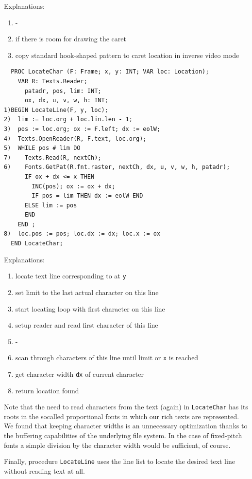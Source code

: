 Explanations:
\begin{enumerate}
  \item -
  \item if there is room for drawing the caret
  \item copy standard hook-shaped pattern to caret location in inverse video mode
\end{enumerate}

\begin{verbatim}
  PROC LocateChar (F: Frame; x, y: INT; VAR loc: Location);
    VAR R: Texts.Reader;
      patadr, pos, lim: INT;
      ox, dx, u, v, w, h: INT;
1)BEGIN LocateLine(F, y, loc);
2)  lim := loc.org + loc.lin.len - 1;
3)  pos := loc.org; ox := F.left; dx := eolW;
4)  Texts.OpenReader(R, F.text, loc.org);
5)  WHILE pos # lim DO
7)    Texts.Read(R, nextCh);
6)    Fonts.GetPat(R.fnt.raster, nextCh, dx, u, v, w, h, patadr);
      IF ox + dx <= x THEN
        INC(pos); ox := ox + dx;
        IF pos = lim THEN dx := eolW END
      ELSE lim := pos
      END
    END ;
8)  loc.pos := pos; loc.dx := dx; loc.x := ox
  END LocateChar;
\end{verbatim}

Explanations:
\begin{enumerate}
  \item locate text line corresponding to at \verb|y|
  \item set limit to the last actual character on this line
  \item start locating loop with first character on this line
  \item setup reader and read first character of this line
  \item -
  \item scan through characters of this line until limit or \verb|x| is reached
  \item get character width \verb|dx| of current character
  \item return location found
\end{enumerate}

Note that the need to read characters from the text (again) in \verb|LocateChar| has its roots
in the socalled proportional fonts in which our rich texts are represented. We found that keeping
character widths is an unnecessary optimization thanks to the buffering capabilities of the underlying
file system. In the case of fixed-pitch fonts a simple division by the character width would be
sufficient, of course.

Finally, procedure \verb|LocateLine| uses the line list to locate the desired text line without
reading text at all.


